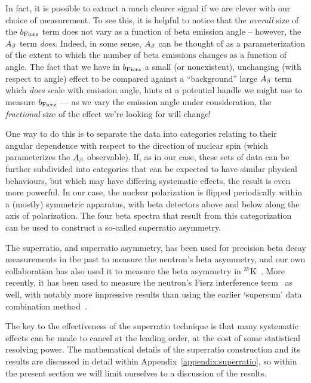 In fact, it is possible to extract a much clearer signal if we are clever with our choice of measurement.  To see this, it is helpful to notice that the \emph{overall} size of the $b_{\mathrm{Fierz}}$ term does not vary as a function of beta emission angle -- however, the $A_{\beta}$ term \emph{does}.  Indeed, in some sense, $A_{\beta}$ can be thought of as a parameterization of the extent to which the number of beta emissions changes as a function of angle.  The fact that we have in $b_{\mathrm{Fierz}}$ a small (or nonexistent), unchanging (with respect to angle) effect to be compared against a ``background'' large $A_{\beta}$ term which \emph{does} scale with emission angle, hints at a potential handle we might use to measure $b_{\mathrm{Fierz}}$ --- as we vary the emission angle under consideration, the \emph{fractional} size of the effect we're looking for will change!

One way to do this is to separate the data into categories relating to their angular dependence with respect to the direction of nuclear spin (which parameterizes the $A_{\beta}$ observable).  If, as in our case, these sets of data can be further subdivided into categories that can be expected to have similar physical behaviours, but which may have differing systematic effects, the result is even more powerful.  In our case, the nuclear polarization is flipped periodically within a (mostly) symmetric apparatus, with beta detectors above and below along the axis of polarization.  The four beta spectra that result from this categorization can be used to construct a so-called superratio asymmetry.   

The superratio, and superratio asymmetry, has been used for precision beta decay measurements in the past to measure the neutron's beta asymmetry\cite{UCNA_first_superratio}, and our own collaboration has also used it to measure the beta asymmetry in $^{37}$K~\cite{ben_Abeta}.  More recently, it has been used to measure the neutron's Fierz interference term~\cite{UCNAfierz2020}\cite{Saul2020} as well, with notably more impressive results than using the earlier `supersum' data combination method~\cite{UCNA_first_Fierz}.  

The key to the effectiveness of the superratio technique is that many systematic effects can be made to cancel at the leading order, at the cost of some statistical resolving power.  The mathematical details of the superratio construction and its results are discussed in detail within Appendix~\ref{appendix:superratio}, so within the present section we will limit ourselves to a discussion of the results.

